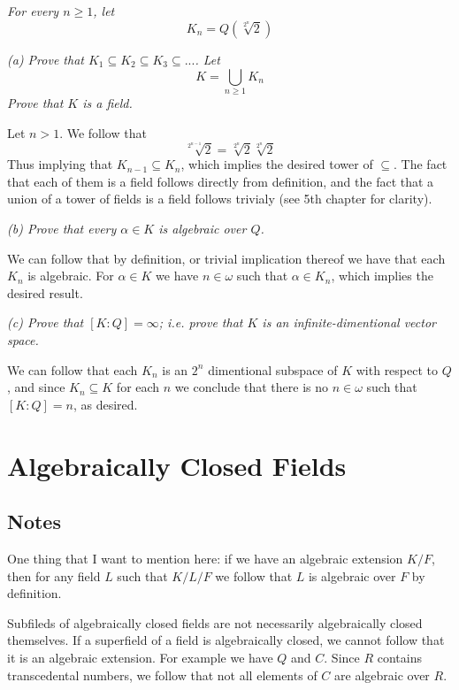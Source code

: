 \documentclass[11pt,oneside,titlepage]{book}
\begin{document}
\subsection{}

\textit{For every $n \geq 1$, let
  $$ K_n = Q(\sqrt[2^n]{2}) $$}

\textit{(a) Prove that $K_1 \subseteq K_2 \subseteq K_3 \subseteq ... $. Let
  $$K = \bigcup_{n \geq 1}{K_n}$$
  Prove that $K$ is a field.}

Let $n > 1$. We follow that
$$ \sqrt[2^{n - 1}]{2} = \sqrt[2^{n}]{2}  \sqrt[2^{n}]{2} $$
Thus implying that $K_{n - 1} \subseteq K_n$, which implies the
desired tower of $\subseteq$. The fact that each of them is a field
follows directly from definition, and the fact that a union of a tower
of fields is a field follows trivialy (see 5th chapter for clarity).

\textit{(b) Prove that every $\alpha \in K$ is algebraic over $Q$.}

We can follow that by definition, or trivial implication thereof we have that
each $K_n$ is algebraic. For $\alpha \in K$ we have $n \in \omega$ such that
$\alpha \in K_n$, which implies the desired result.

\textit{(c) Prove that $[K:Q] = \infty$; i.e. prove that $K$ is an
infinite-dimentional vector space.}

We can follow that each $K_n$ is an $2^n$ dimentional subspace of $K$
with respect to $Q$, and since $K_n \subseteq K$ for each $n$ we
conclude that there is no $n \in \omega$ such that $[K:Q] = n$,
as desired.

\section{Algebraically Closed Fields}

\subsection*{Notes}

One thing that I want to mention here: if we have an algebraic extension
$K/F$, then for any field $L$ such that $K/L/F$ we follow that $L$
is algebraic over $F$ by definition.

Subfileds of algebraically closed fields are not necessarily algebraically
closed themselves. If a superfield of a field is algebraically closed,
we cannot follow that it is an algebraic extension. For example we have
$Q$ and $C$. Since $R$ contains transcedental numbers, we follow that
not all elements of $C$ are algebraic over $R$.
\end{document}
